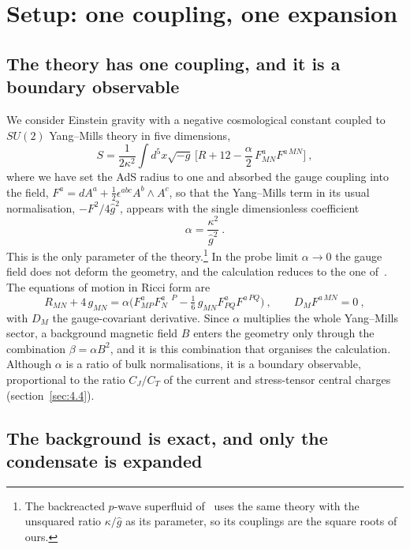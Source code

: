 \section{Setup: one coupling, one expansion}
\label{sec:2}

\subsection{The theory has one coupling, and it is a boundary observable}
\label{sec:2.1}

We consider Einstein gravity with a negative cosmological constant coupled to
$SU(2)$ Yang--Mills theory in five dimensions,
\begin{equation}
S = \frac{1}{2\kappa^2}\int d^5x\sqrt{-g}\,\Big[R + 12 - \frac{\alpha}{2}\,F^a_{MN}F^{a\,MN}\Big]~,
\end{equation}
where we have set the AdS radius to one and absorbed the gauge coupling into
the field, $F^a = dA^a + \tfrac12\epsilon^{abc}A^b\wedge A^c$, so that the
Yang--Mills term in its usual normalisation, $-F^2/4\hat g^2$, appears with
the single dimensionless coefficient
\begin{equation}
\alpha = \frac{\kappa^2}{\hat g^2}~.
\end{equation}
This is the only parameter of the theory.\footnote{The backreacted $p$-wave
superfluid of~\cite{Ammon:2009xh} uses the same theory with the unsquared
ratio $\kappa/\hat g$ as its parameter, so its couplings are the square roots
of ours.} In the probe limit $\alpha \to 0$
the gauge field does not deform the geometry, and the calculation reduces to
the one of~\cite{Ammon:2011je}. The equations of motion in Ricci form are
\begin{equation}
R_{MN} + 4\,g_{MN} = \alpha\Big(F^a_{MP}F^{a\phantom{N}P}_{N} - \tfrac16\,g_{MN}F^a_{PQ}F^{a\,PQ}\Big)~, \qquad
D_M F^{a\,MN} = 0~,
\end{equation}
with $D_M$ the gauge-covariant derivative. Since $\alpha$ multiplies the
whole Yang--Mills sector, a background magnetic field $B$ enters the geometry
only through the combination $\beta = \alpha B^2$, and it is this
combination that organises the calculation. Although $\alpha$ is a ratio of
bulk normalisations, it is a boundary observable, proportional to the ratio
$C_J/C_T$ of the current and stress-tensor central charges
(section~\ref{sec:4.4}).

\subsection{The background is exact, and only the condensate is expanded}
\label{sec:2.2}

